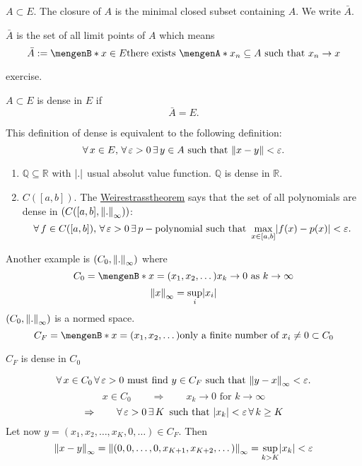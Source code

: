 \begin{definition*}[closure]
	$A \subset E$. The closure of $A$ is the minimal closed subset containing $A$. We write $\bar{A}$.
\end{definition*}
\begin{proposition*}
	$\bar{A}$ is the set of all limit points of $A$ which means
	\[
		\bar{A} := \set[x \in E]{\text{there exists $\set{x_n} \subseteq A$ such that $x_n \to x$}}
	\]
\end{proposition*}
\begin{beweis}
	exercise.
\end{beweis}
\begin{definition*}[dense]
	$A \subset E$ is dense in $E$ if 
	\[
		\bar{A} = E.
	\]
\end{definition*}
\begin{bemerkung}
	This definition of dense is equivalent to the following definition:
	\[
		\forall\, x \in E,\,\forall\, \varepsilon>0 \,\exists\,y \in A \text{ such that } \norm{x-y} < \varepsilon.
	\]
\end{bemerkung}
\begin{beispiele}
	\begin{enumerate}[1)]
		\item $\mathbb{Q} \subseteq \mathbb{R}$ with $\lvert.\rvert$ usual absolut value function. $\mathbb{Q}$ is dense in $\mathbb{R}$.
		\item $C([a,b])$. The \underline{Weirestrasstheorem} says that the set of all polynomials are dense in $(C([a,b],\norm{.}_{\infty}))$:
		\[
			\forall\, f \in C([a,b]),\,\forall\, \varepsilon>0 \,\exists\,p-\text{polynomial such that }\max_{x \in [a,b]}\lvert f(x)-p(x)\rvert < \varepsilon.
		\]
	\end{enumerate}
\end{beispiele}
Another example is $(C_0, \norm{.}_{\infty})$ where
		\[
			C_0 = \set[x = (x_1,x_2,\dots)]{x_k \to 0 \text{ as }k \to \infty}
		\]
		\[
			\norm{x}_{\infty}= \sup_{i}\abs{x_i}
		\]
		$(C_0,\norm{.}_{\infty})$ is a normed space. 
		\[
			C_F = \set[x = (x_1,x_2,\dots)]{\text{only a finite number of }x_i \neq 0} \subset C_0
		\]
\begin{satz*}
	$C_F$ is dense in $C_0$
\end{satz*}
\begin{beweis}
	\[
		\forall\,  x \in C_0 \,\forall\, \varepsilon>0 \text{ must find }y \in C_F \text{ such that }\norm{y-x}_{\infty} < \varepsilon.
	\]
	\[
		x \in C_0 \qquad \Rightarrow \qquad x_k \to 0 \text{ for }k \to \infty 
	\]
	\[
		\Rightarrow \qquad \forall\, \varepsilon >0 \,\exists\,K \,\text{ such that } \lvert x_k\rvert < \varepsilon \, \forall\, k \geq K
	\]
	Let now $y = (x_1,x_2, \dots,x_K, 0, \dots) \in C_F$. Then 
	\[
		\norm{x-y}_{\infty} = \norm{(0,0,\dots,0,x_{K+1},x_{K+2},\dots)}_{\infty} = \sup_{k >K}\abs{x_k} < \varepsilon
	\]
\end{beweis}
